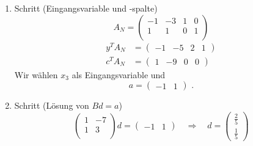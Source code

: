 \documentclass[a4paper]{scrartcl}
\begin{document}
\begin{enumerate}[label=\bfseries\arabic*.]
\begin{enumerate}[1.]
\begin{enumerate}[1.]
                    \item Schritt (Eingangsvariable und -spalte)
                        \begin{equation}
                            A_N =
                            \begin{pmatrix}
                                -1 & -3 & 1 & 0 \\
                                 1 &  1 & 0 & 1 \\
                            \end{pmatrix}
                        \end{equation}
                        \begin{align}
                            y^TA_N &=
                            \begin{pmatrix}
                                -1 & -5 & 2 & 1
                            \end{pmatrix} \\
                            c^TA_N &=
                            \begin{pmatrix}
                                1 & -9 & 0 & 0
                            \end{pmatrix}
                        \end{align}
                        Wir wählen $x_3$ als Eingangsvariable und
                        \begin{equation}
                            a =
                            \begin{pmatrix}
                                -1 & 1
                            \end{pmatrix}
                            \text{ .}   
                        \end{equation}

                    \item Schritt (Lösung von $Bd = a$)
                        \begin{equation}
                            \begin{pmatrix}
                                1 & -7 \\
                                1 &  3 \\
                            \end{pmatrix}
                            d
                            =
                            \begin{pmatrix}
                                -1 & 1
                            \end{pmatrix}
                            \quad\Rightarrow\quad
                            d =
                            \begin{pmatrix}
                                \frac{2}{5} \\ \frac{1}{5}
                            \end{pmatrix}
                        \end{equation}


\end{enumerate}
\end{enumerate}
\end{enumerate}
\end{document}
